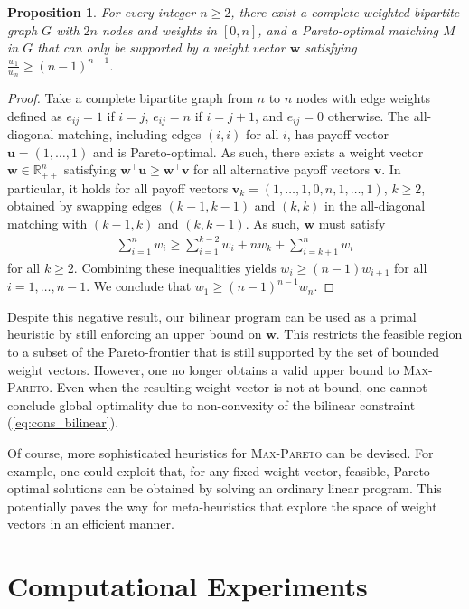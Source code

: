 \documentclass[a4paper, 11pt]{article}
\newtheorem{prop}[thm]{Proposition}
\begin{document}
\begin{prop}
For every integer $n \geq 2$, there exist a complete weighted bipartite graph $G$ with $2n$ nodes and weights in $[0, n]$, and a Pareto-optimal matching $M$ in $G$ that can only be supported by a weight vector $\bm{w}$ satisfying $\frac{w_1}{w_n} \geq (n-1)^{n-1}$. 
\end{prop}

\begin{proof}
Take a complete bipartite graph from $n$ to $n$ nodes with edge weights defined as $e_{ij} = 1$ if $i=j$, $e_{ij} = n$ if $i = j + 1$, and $e_{ij} = 0$ otherwise. The all-diagonal matching, including edges $(i, i)$ for all $i$, has payoff vector $\bm{u} = (1, \dots, 1)$ and is Pareto-optimal. As such, there exists a weight vector $\bm{w} \in \mathbb{R}_{++}^{n}$ satisfying $\bm{w}^\top \bm{u} \geq \bm{w}^\top \bm{v}$ for all alternative payoff vectors $\bm{v}$. In particular, it holds for all payoff vectors $\bm{v}_k = (1, \dots, 1, 0, n, 1, \dots, 1)$, $k \geq 2$, obtained by swapping edges $(k - 1, k - 1)$ and $(k, k)$ in the all-diagonal matching with $(k - 1, k)$ and $(k, k - 1)$. As such, $\bm{w}$ must satisfy 
\begin{align}
    \sum_{i=1}^{n} w_i \geq \sum_{i=1}^{k - 2} w_i + n w_k + \sum_{i=k+1}^{n} w_i
\end{align}
for all $k \geq 2$. Combining these inequalities yields $w_i \geq (n-1) w_{i+1}$ for all $i=1,\ldots,n-1$. We conclude that $w_1 \geq (n-1)^{n-1} w_n$. 
\end{proof}

Despite this negative result, our bilinear program can be used as a primal heuristic by still enforcing an upper bound on $\bm{w}$. This restricts the feasible region to a subset of the Pareto-frontier that is still supported by the set of bounded weight vectors. However, one no longer obtains a valid upper bound to \textsc{Max-Pareto}. Even when the resulting weight vector is not at bound, one cannot conclude global optimality due to non-convexity of the bilinear constraint (\ref{eq:cons_bilinear}).

Of course, more sophisticated heuristics for \textsc{Max-Pareto} can be devised. For example, one could exploit that, for any fixed weight vector, feasible, Pareto-optimal solutions can be obtained by solving an ordinary linear program. This potentially paves the way for meta-heuristics that explore the space of weight vectors in an efficient manner.

\section{Computational Experiments}
\label{sec:experiments}
\end{document}
